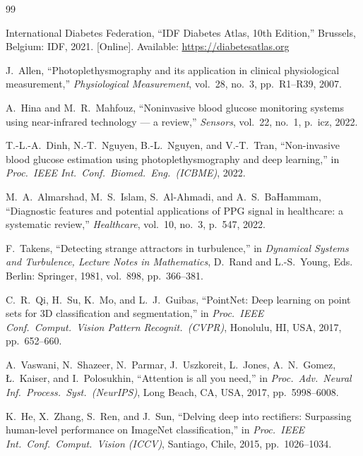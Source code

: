 \documentclass[conference]{IEEEtran}
\begin{document}
\begin{thebibliography}{99}

International Diabetes Federation,
``IDF Diabetes Atlas, 10th Edition,''
Brussels, Belgium: IDF, 2021.
[Online]. Available: \url{https://diabetesatlas.org}

J.~Allen,
``Photoplethysmography and its application in clinical physiological
measurement,''
\textit{Physiological Measurement}, vol.~28, no.~3, pp.~R1--R39, 2007.

A.~Hina and M.~R.~Mahfouz,
``Noninvasive blood glucose monitoring systems using near-infrared technology
--- a review,''
\textit{Sensors}, vol.~22, no.~1, p.~icz, 2022.

T.-L.-A.~Dinh, N.-T.~Nguyen, B.-L.~Nguyen, and V.-T.~Tran,
``Non-invasive blood glucose estimation using photoplethysmography and
deep learning,''
in \textit{Proc.\ IEEE Int.\ Conf.\ Biomed.\ Eng.\ (ICBME)}, 2022.

M.~A.~Almarshad, M.~S.~Islam, S.~Al-Ahmadi, and A.~S.~BaHammam,
``Diagnostic features and potential applications of PPG signal in healthcare:
a systematic review,''
\textit{Healthcare}, vol.~10, no.~3, p.~547, 2022.

F.~Takens,
``Detecting strange attractors in turbulence,''
in \textit{Dynamical Systems and Turbulence, Lecture Notes in Mathematics},
D.~Rand and L.-S.~Young, Eds.
Berlin: Springer, 1981, vol.~898, pp.~366--381.

C.~R.~Qi, H.~Su, K.~Mo, and L.~J.~Guibas,
``PointNet: Deep learning on point sets for 3D classification and segmentation,''
in \textit{Proc.\ IEEE Conf.\ Comput.\ Vision Pattern Recognit.\ (CVPR)},
Honolulu, HI, USA, 2017, pp.~652--660.

A.~Vaswani, N.~Shazeer, N.~Parmar, J.~Uszkoreit, L.~Jones, A.~N.~Gomez,
{\L}.~Kaiser, and I.~Polosukhin,
``Attention is all you need,''
in \textit{Proc.\ Adv.\ Neural Inf.\ Process.\ Syst.\ (NeurIPS)},
Long Beach, CA, USA, 2017, pp.~5998--6008.

K.~He, X.~Zhang, S.~Ren, and J.~Sun,
``Delving deep into rectifiers: Surpassing human-level performance on
ImageNet classification,''
in \textit{Proc.\ IEEE Int.\ Conf.\ Comput.\ Vision (ICCV)},
Santiago, Chile, 2015, pp.~1026--1034.


\end{thebibliography}
\end{document}
